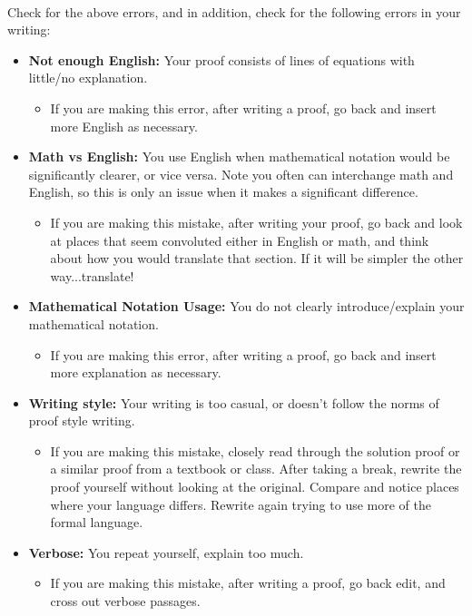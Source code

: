 \documentclass[12pt]{article}
\theoremstyle{definition}
\begin{document}
~\\Check for the above errors, and in addition, check for the following errors in your writing:
\begin{itemize}
\item \textbf{Not enough English:} Your proof consists of lines of equations with little/no explanation.
\begin{itemize}
\item  If you are making this error, after writing a proof, go back and insert more English as necessary.
\end{itemize}

\item \textbf{Math vs English:} You use English when mathematical notation would be significantly clearer, or vice versa. Note you often can interchange math and English, so this is only an issue when it makes a significant difference. 
\begin{itemize}
\item 
If you are making this mistake, after writing your proof, go back and look at places that seem convoluted either in English or math, and think about how you would translate that section. If it will be simpler the other way...translate!
\end{itemize}
\item \textbf{Mathematical Notation Usage:} You do not clearly introduce/explain your mathematical notation.
\begin{itemize}
\item  If you are making this error, after writing a proof, go back and insert more explanation as necessary.
\end{itemize}
\item \textbf{Writing style:} Your writing is too casual, or doesn't follow the norms of proof style writing.
\begin{itemize}
\item  If you are making this mistake, closely read through the solution proof or a similar proof from a textbook or class. After taking a break, rewrite the proof yourself without looking at the original. Compare and notice places where your language differs. Rewrite again trying to use more of the formal language.
\end{itemize} 
\item \textbf{Verbose:} You repeat yourself, explain too much.
\begin{itemize}
\item  If you are making this mistake, after writing a proof, go back edit, and cross out verbose passages.
\end{itemize}  
\end{itemize}
\end{document}
